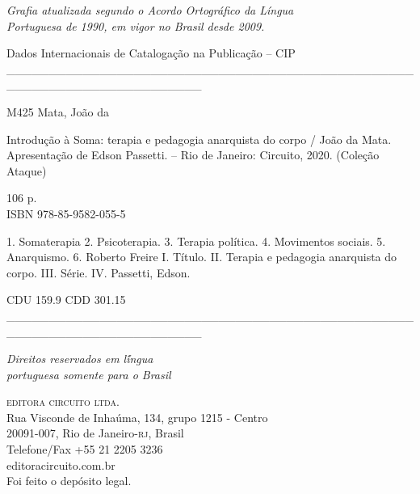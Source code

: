 {\begingroup \tiny

\textit{Grafia atualizada segundo o Acordo Ortográfico da Língua\\
Portuguesa de 1990, em vigor no Brasil desde 2009.}\\

\begin{flushleft}
\hspace{10pt}Dados Internacionais de Catalogação na Publicação -- CIP
\_\_\_\_\_\_\_\_\_\_\_\_\_\_\_\_\_\_\_\_\_\_\_\_\_\_\_\_\_\_\_\_\_\_\_\_\_\_\_\_\_\_\_\_\_\_\_\_\_\_\_\_\_\_\_\_\_\_\_\_\_\_\_\_\_\_\_\_\_\_\_
\end{flushleft}
M425 \hspace{5pt}Mata, João da\\
\hspace{20pt}\parbox{185pt}{Introdução à Soma: terapia e pedagogia anarquista do corpo / João da Mata. Apresentação de Edson Passetti. -- Rio de Janeiro: Circuito, 2020. (Coleção Ataque)}

\hspace{20pt}106 p.\\[6pt]

\hspace{20pt}ISBN 978-85-9582-055-5\\[6pt]

\hspace{20pt}\parbox{185pt}{1. Somaterapia 2. Psicoterapia. 3. Terapia política. 4. Movimentos sociais. 5. Anarquismo. 6. Roberto Freire I. Título. II. Terapia e pedagogia anarquista do corpo. III. Série. IV. Passetti, Edson.}

\begin{flushleft}
\hspace{20pt}CDU 159.9 \hspace{130pt}CDD 301.15
\_\_\_\_\_\_\_\_\_\_\_\_\_\_\_\_\_\_\_\_\_\_\_\_\_\_\_\_\_\_\_\_\_\_\_\_\_\_\_\_\_\_\_\_\_\_\_\_\_\_\_\_\_\_\_\_\_\_\_\_\_\_\_\_\_\_\_\_\_\_\_\\
\end{flushleft}

\vfill\textit{Direitos reservados em l\'íngua\\ portuguesa somente para o Brasil}\\\medskip

%
\textsc{editora circuito ltda.}\\ 
Rua Visconde de Inhaúma, 134, grupo 1215 - Centro\\
20091-007, Rio de Janeiro-\textsc{rj}, Brasil\\
Telefone/Fax +55 21 2205 3236\\\smallskip
editoracircuito.com.br\\
\bigskip
Foi feito o depósito legal.\\\endgroup
\pagebreak\raggedleft
\titulagem

}

